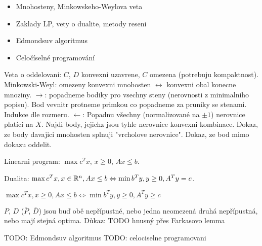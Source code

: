 \begin{itemize}
\item Mnohosteny, Minkowskeho-Weylova veta
\item Zaklady LP, vety o dualite, metody reseni
\item Edmondsuv algoritmus
\item Celočíselné programování
\end{itemize}

Veta o oddelovani: $C$, $D$ konvexni uzavrene, $C$ omezena (potrebuju
kompaktnost).
Minkowski-Weyl: omezeny konvexni mnohosten $\leftrightarrow$ konvexni obal
konecne mnoziny. $\rightarrow$: popadneme bodiky pro vsechny steny (nerovnosti
z minimalniho popisu). Bod vevnitr protneme primkou co popadneme za pruniky
se stenami. Indukce dle rozmeru.
$\leftarrow$: Popadnu všechny (normalizované na $\pm 1$) nerovnice platící
na $X$. Najdi body, jejichz jsou tyhle nerovnice konvexni kombinace.
Dokaz, ze body davajici mnohosten splnuji "vrcholove nerovnice".
Dokaz, ze bod mimo dokazu oddelit.

Linearni program: $\max c^T x$, $x\geq 0$, $Ax\leq b$.

Dualita: $\max c^T x, x\in\mathbb{R}^n, Ax\leq b \Leftrightarrow \min b^T y, y\geq 0,
A^T y=c$.

$\max c^T x, x\geq 0, Ax\leq b \Leftrightarrow \min b^T y, y\geq 0, A^T y\geq c$

$P$, $D$ ($\bar{P}$, $\bar{D}$) jsou buď obě nepřípustné, nebo jedna
neomezená druhá nepřípustná, nebo mají stejná optima.
Důkaz: TODO hnusný přes Farkasovo lemma

TODO: Edmondsuv algoritmus
TODO: celociselne programovani
